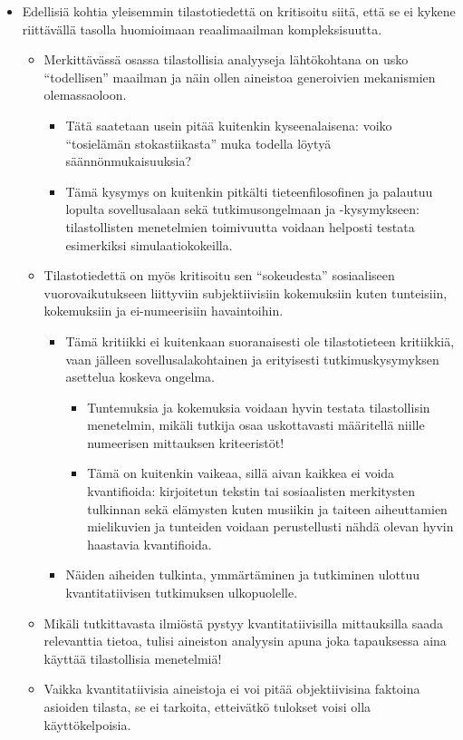 \documentclass[
]{book}
\providecommand{\tightlist}{%
  \setlength{\itemsep}{0pt}\setlength{\parskip}{0pt}}
\begin{document}
\begin{itemize}
\tightlist
\item
  Edellisiä kohtia yleisemmin tilastotiedettä on kritisoitu siitä, että se ei kykene riittävällä tasolla huomioimaan reaalimaailman kompleksisuutta.

  \begin{itemize}
  \tightlist
  \item
    Merkittävässä osassa tilastollisia analyyseja lähtökohtana on usko ``todellisen'' maailman ja näin ollen aineistoa generoivien mekanismien olemassaoloon.

    \begin{itemize}
    \tightlist
    \item
      Tätä saatetaan usein pitää kuitenkin kyseenalaisena: voiko ``tosielämän stokastiikasta'' muka todella löytyä säännönmukaisuuksia?
    \item
      Tämä kysymys on kuitenkin pitkälti tieteenfilosofinen ja palautuu lopulta sovellusalaan sekä tutkimusongelmaan ja -kysymykseen: tilastollisten menetelmien toimivuutta voidaan helposti testata esimerkiksi simulaatiokokeilla.\\
    \end{itemize}
  \item
    Tilastotiedettä on myös kritisoitu sen ``sokeudesta'' sosiaaliseen vuorovaikutukseen liittyviin subjektiivisiin kokemuksiin kuten tunteisiin, kokemuksiin ja ei-numeerisiin havaintoihin.

    \begin{itemize}
    \tightlist
    \item
      Tämä kritiikki ei kuitenkaan suoranaisesti ole tilastotieteen kritiikkiä, vaan jälleen sovellusalakohtainen ja erityisesti tutkimuskysymyksen asettelua koskeva ongelma.

      \begin{itemize}
      \tightlist
      \item
        Tuntemuksia ja kokemuksia voidaan hyvin testata tilastollisin menetelmin, mikäli tutkija osaa uskottavasti määritellä niille numeerisen mittauksen kriteeristöt!
      \item
        Tämä on kuitenkin vaikeaa, sillä aivan kaikkea ei voida kvantifioida: kirjoitetun tekstin tai sosiaalisten merkitysten tulkinnan sekä elämysten kuten musiikin ja taiteen aiheuttamien mielikuvien ja tunteiden voidaan perustellusti nähdä olevan hyvin haastavia kvantifioida.
      \end{itemize}
    \item
      Näiden aiheiden tulkinta, ymmärtäminen ja tutkiminen ulottuu kvantitatiivisen tutkimuksen ulkopuolelle.
    \end{itemize}
  \item
    Mikäli tutkittavasta ilmiöstä pystyy kvantitatiivisilla mittauksilla saada relevanttia tietoa, tulisi aineiston analyysin apuna joka tapauksessa aina käyttää tilastollisia menetelmiä!
  \item
    Vaikka kvantitatiivisia aineistoja ei voi pitää objektiivisina faktoina asioiden tilasta, se ei tarkoita, etteivätkö tulokset voisi olla käyttökelpoisia.
  \end{itemize}
\end{itemize}
\end{document}
